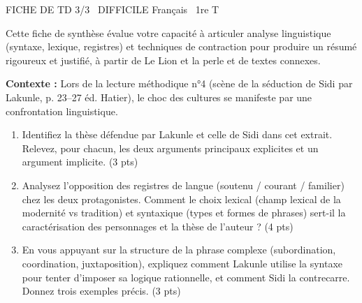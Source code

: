 \documentclass[11pt]{article}
\begin{document}
\begin{tcolorbox}[enhanced,colback=popink,colframe=popink,arc=10pt,boxrule=0pt,left=12pt,right=12pt,top=9pt,bottom=9pt]
{\color{white}\popxbold\small FICHE DE TD 3/3 \textbullet\ DIFFICILE \hfill Français \textbullet\ 1re T\par}
\end{tcolorbox}
\vspace{4pt}
\noindent Cette fiche de synthèse évalue votre capacité à articuler analyse linguistique (syntaxe, lexique, registres) et techniques de contraction pour produire un résumé rigoureux et justifié, à partir de \og Le Lion et la perle \fg{} et de textes connexes.

\begin{exercice}
\textbf{Contexte :} Lors de la lecture méthodique n°4 (scène de la séduction de Sidi par Lakunle, p. 23--27 éd. Hatier), le choc des cultures se manifeste par une confrontation linguistique.
\begin{enumerate}
    \item Identifiez la thèse défendue par Lakunle et celle de Sidi dans cet extrait. Relevez, pour chacun, les deux arguments principaux explicites et un argument implicite. (3 pts)
    \item Analysez l'opposition des registres de langue (soutenu / courant / familier) chez les deux protagonistes. Comment le choix lexical (champ lexical de la modernité vs tradition) et syntaxique (types et formes de phrases) sert-il la caractérisation des personnages et la thèse de l'auteur ? (4 pts)
    \item En vous appuyant sur la structure de la phrase complexe (subordination, coordination, juxtaposition), expliquez comment Lakunle utilise la syntaxe pour tenter d'imposer sa logique rationnelle, et comment Sidi la contrecarre. Donnez trois exemples précis. (3 pts)
\end{enumerate}
\end{exercice}
\end{document}
